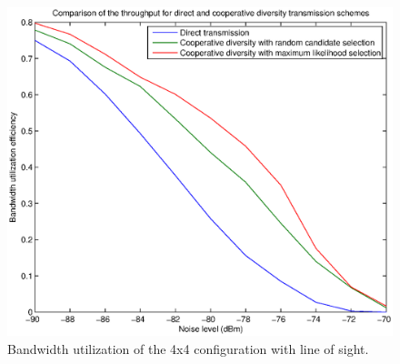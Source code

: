 \begin{figure}
\includegraphics[scale=.55]{figures/4x4throughput}
\caption{Bandwidth utilization of the 4x4 configuration with line of sight.}
\label{fig:4x4throughput}
\end{figure}